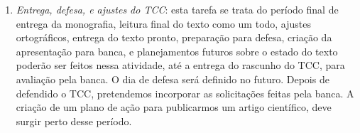 \begin{enumerate}
\item \textit{Entrega, defesa, e ajustes do TCC}: esta tarefa se trata do período final de entrega da monografia, leitura final do texto como um todo, ajustes ortográficos, entrega do texto pronto, preparação para defesa, criação da apresentação para banca, e planejamentos futuros sobre o estado do texto poderão ser feitos nessa atividade, até a entrega do rascunho do TCC, para avaliação pela banca. O dia de defesa será definido no futuro. Depois de defendido o TCC, pretendemos incorporar as solicitações feitas pela banca. A criação de um plano de ação para publicarmos um artigo científico, deve surgir perto desse período.
\end{enumerate}
